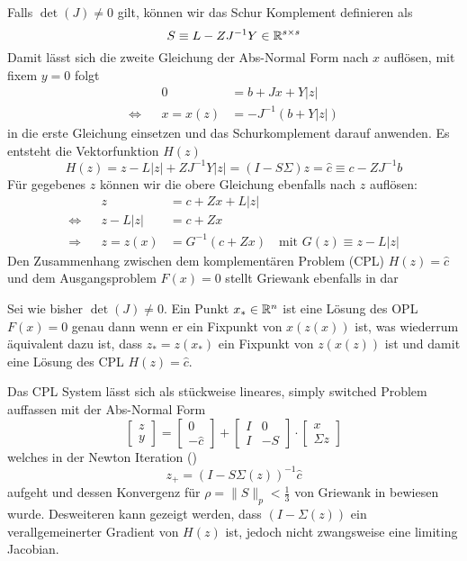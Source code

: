 Falls $\det(J) \neq 0$ gilt, können wir das Schur Komplement definieren als 
 \[
  S \equiv L -ZJ^{-1}Y \in \mathbb{R}^{s\times s}
 \]
Damit lässt sich die zweite Gleichung der Abs-Normal Form nach $x$ auflösen, mit fixem $y=0$ folgt
\[
 \begin{aligned}
		 && 0 &=  b+Jx + Y|z|   \\
 \Leftrightarrow && x = x(z) &=-J^{-1}(b+Y|z|)
 \end{aligned}
\]
in die erste Gleichung einsetzen und das Schurkomplement darauf anwenden. Es entsteht die Vektorfunktion $H(z)$
\[
 H(z) = z - L|z| + ZJ^{-1}Y|z| = (I-S\Sigma)z = \hat c \equiv c-ZJ^{-1}b
 \]
Für gegebenes $z$ können wir die obere Gleichung ebenfalls nach $z$ auflösen:
\[
\begin{aligned}
		 && z &= c+Zx + L|z|\\
 \Leftrightarrow && z- L |z| &= c+Zx \\
 \Rightarrow && z = z(x) &= G^{-1}(c+Zx)\quad \text{mit }G(z)\equiv z-L|z|
\end{aligned} 
\]
Den Zusammenhang zwischen dem komplementären Problem (CPL) $H(z) = \hat c$ und dem Ausgangsproblem $F(x) = 0$ stellt Griewank ebenfalls in \cite[Lemma 6.5.]{plan} dar

\begin{theorem}
 Sei wie bisher $\det(J)\neq 0$. Ein Punkt $x_*\in \mathbb{R}^n$ ist eine Lösung des OPL $F(x)=0$ genau dann wenn er ein Fixpunkt von $x(z(x))$ ist, was wiederrum äquivalent dazu ist, dass $z_*=z(x_*)$ ein Fixpunkt von $z(x(z))$ ist und damit eine Lösung des CPL $H(z)=\hat c$.
\end{theorem}

Das CPL System lässt sich als stückweise lineares, simply switched Problem auffassen mit der Abs-Normal Form
\[
 \begin{bmatrix}
  z\\
  y
 \end{bmatrix}
=
 \begin{bmatrix}
  0\\
  -\hat c
 \end{bmatrix}
+
 \begin{bmatrix}
  I & 0\\
  I & -S
 \end{bmatrix}
\cdot
 \begin{bmatrix}
  x\\
  \Sigma z
 \end{bmatrix}
\]
welches in der Newton Iteration (\cite[S.20]{plan})
\begin{equation}
\label{eq:unfoldedNewton}
 z_+ = (I-S\Sigma(z))^{-1}\hat c
\end{equation}
aufgeht und dessen Konvergenz für $\rho = \|S\|_p <\frac{1}{3}$ von Griewank in \cite[Prop. 7.3]{plan} bewiesen wurde. 
Desweiteren kann gezeigt werden, dass $(I-\Sigma(z))$ ein verallgemeinerter Gradient von $H(z)$ ist, jedoch nicht zwangsweise eine limiting Jacobian.
 
